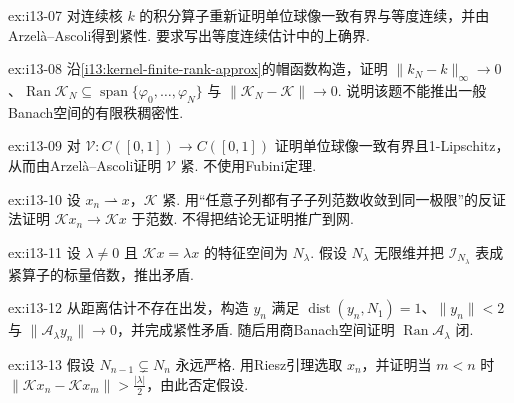 \begin{FAExercise}{ex:i13-07}
对连续核 \(\displaystyle k\) 的积分算子重新证明单位球像一致有界与等度连续，并由Arzelà--Ascoli得到紧性. 要求写出等度连续估计中的上确界.
\end{FAExercise}

\begin{FAExercise}[核插值的有限秩逼近]{ex:i13-08}
沿\autoref{i13:kernel-finite-rank-approx}的帽函数构造，证明 \(\displaystyle \|k_N-k\|_\infty\to0\)、\(\displaystyle \operatorname{Ran}\mathcal K_N\subseteq\operatorname{span}\{\varphi_0,\dots,\varphi_N\}\) 与 \(\displaystyle \|\mathcal K_N-\mathcal K\|\to0\). 说明该题不能推出一般Banach空间的有限秩稠密性.
\end{FAExercise}

\begin{FAExercise}[Volterra紧性]{ex:i13-09}
对 \(\displaystyle \mathcal V:C([0,1])\to C([0,1])\) 证明单位球像一致有界且1-Lipschitz，从而由Arzelà--Ascoli证明 \(\displaystyle \mathcal V\) 紧. 不使用Fubini定理.
\end{FAExercise}

\begin{FAExercise}[弱收敛到范数收敛]{ex:i13-10}
设 \(\displaystyle x_n\rightharpoonup x\)，\(\displaystyle \mathcal K\) 紧. 用“任意子列都有子子列范数收敛到同一极限”的反证法证明 \(\displaystyle \mathcal Kx_n\to\mathcal Kx\) 于范数. 不得把结论无证明推广到网.
\end{FAExercise}

\begin{FAExercise}[非零特征空间有限维]{ex:i13-11}
设 \(\displaystyle \lambda\neq0\) 且 \(\displaystyle \mathcal Kx=\lambda x\) 的特征空间为 \(\displaystyle N_\lambda\). 假设 \(\displaystyle N_\lambda\) 无限维并把 \(\displaystyle \mathcal I_{N_\lambda}\) 表成紧算子的标量倍数，推出矛盾.
\end{FAExercise}

\begin{FAExercise}[闭值域估计]{ex:i13-12}
从距离估计不存在出发，构造 \(\displaystyle y_n\) 满足 \(\displaystyle \operatorname{dist}(y_n,N_1)=1\)、\(\displaystyle \|y_n\|<2\) 与 \(\displaystyle \|\mathcal A_\lambda y_n\|\to0\)，并完成紧性矛盾. 随后用商Banach空间证明 \(\displaystyle \operatorname{Ran}\mathcal A_\lambda\) 闭.
\end{FAExercise}

\begin{FAExercise}[核链稳定化]{ex:i13-13}
假设 \(\displaystyle N_{n-1}\subsetneq N_n\) 永远严格. 用Riesz引理选取 \(\displaystyle x_n\)，并证明当 \(\displaystyle m<n\) 时 \(\displaystyle \|\mathcal Kx_n-\mathcal Kx_m\|>\frac{|\lambda|}{2}\)，由此否定假设.
\end{FAExercise}

